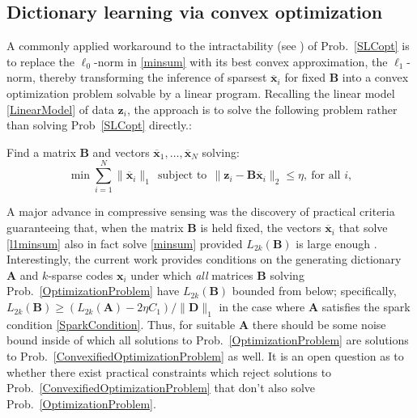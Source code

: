 \subsection{Dictionary learning via convex optimization}

A commonly applied workaround to the intractability (see \cite{tillmann2015computational}) of Prob.~\ref{SLCopt} is to replace the $\ell_0$-norm in \eqref{minsum} with its best convex approximation, the $\ell_1$-norm, thereby transforming the inference of sparsest $\mathbf{\overline x}_i$ for fixed $\mathbf{B}$ into a convex optimization problem solvable by a linear program. Recalling the linear model \eqref{LinearModel} of data $\mathbf{z}_i$, the approach is to solve the following problem rather than solving Prob~\ref{SLCopt} directly.:

\begin{problem}\label{ConvexifiedOptimizationProblem}
Find a matrix $\mathbf{B}$ and vectors \mbox{$\mathbf{\overline x}_1, \ldots, \mathbf{\overline x}_N$} solving:
\begin{equation}\label{l1minsum}
\min \sum_{i = 1}^N \|\mathbf{\overline x}_{i}\|_1 \ \
\text{subject to} \ \ \|\mathbf{z}_i - \mathbf{B}\mathbf{\overline x}_i\|_2 \leq \eta, \ \text{for all $i$},
\end{equation}
\end{problem}


A major advance in compressive sensing was the discovery of practical criteria guaranteeing that, when the matrix $\mathbf{B}$ is held fixed, the vectors $\mathbf{\overline x}_i$ that solve \eqref{l1minsum} also in fact solve \eqref{minsum} provided $L_{2k}(\mathbf{B})$ is large enough \cite{eldar2012compressed}. Interestingly, the current work provides conditions on the generating dictionary $\mathbf{A}$ and $k$-sparse codes $\mathbf{x}_i$ under which \emph{all} matrices $\mathbf{B}$ solving Prob.~\ref{OptimizationProblem} have $L_{2k}(\mathbf{B})$ bounded from below; specifically, $L_{2k}(\mathbf{B}) \geq \left(L_{2k}(\mathbf{A}) - 2\eta C_1 \right) / \|\mathbf{D}\|_1$ in the case where $\mathbf{A}$ satisfies the spark condition \eqref{SparkCondition}. Thus, for suitable $\mathbf{A}$ there should be some noise bound inside of which all solutions to Prob.~\ref{OptimizationProblem} are solutions to Prob.~\ref{ConvexifiedOptimizationProblem} as well. It is an open question as to whether there exist practical constraints which reject solutions to Prob.~\ref{ConvexifiedOptimizationProblem} that don't also solve Prob.~\ref{OptimizationProblem}.

